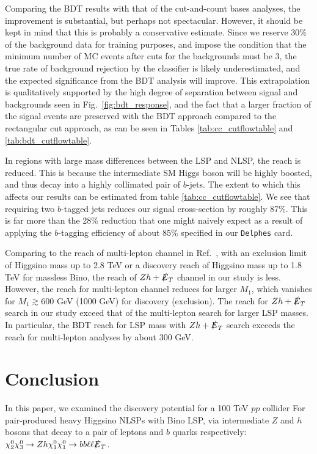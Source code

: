 \documentclass[a4paper,11pt]{article}
\newcommand{\met}{{\slashed{E}_T}}
\begin{document}
Comparing the BDT results with that of the cut-and-count bases analyses, the improvement is substantial, but perhaps not spectacular. However, it should
be kept in mind that this is probably a conservative estimate. Since we reserve
30\% of the background data for training purposes, and impose the condition that the
minimum number of MC events after cuts for the backgrounds must be 3, the true rate of background
rejection by the classifier is likely underestimated, and the expected
significance from the BDT analysis will improve. This extrapolation is
qualitatively supported by the high degree of separation between signal and
backgrounds seen in Fig.~\ref{fig:bdt_response}, and the fact that a larger
fraction of the signal events are preserved with the BDT approach compared to
the rectangular cut approach, as can be seen in Tables \ref{tab:cc_cutflowtable}
and \ref{tab:bdt_cutflowtable}.  

In regions with large mass differences between the LSP and NLSP, the reach is
reduced.  This is because the intermediate SM Higgs boson will be highly boosted, and
thus decay into a highly collimated pair of $b$-jets. The extent to which this
affects our results can be estimated from table \ref{tab:cc_cutflowtable}. We
see that requiring two $b$-tagged jets reduces our signal cross-section by
roughly 87\%. This is far more than the 28\% reduction that one might naively
expect as a result of applying the $b$-tagging efficiency of about 85\%
specified in our \texttt{Delphes} card.  
 
Comparing to the reach of multi-lepton channel in Ref.~\cite{Gori:2014oua},
with an  exclusion limit of Higgsino mass up to 2.8 TeV or a discovery reach
of Higgsino mass up to 1.8 TeV for massless Bino, the reach of $Zh+\met$
channel in our study is less.  However, the reach for multi-lepton channel
reduces for larger $M_1$, which vanishes for $M_1\gtrsim 600$ GeV (1000 GeV)
for discovery (exclusion).   The reach for $Zh+\met$ search in our study
exceed that of the multi-lepton search for larger LSP masses.  In particular,
the BDT reach for LSP mass with $Zh+\met$ search exceeds the reach for
multi-lepton analyses by about 300 GeV.  



\section{Conclusion}\label{sec:conclusion}

In this paper, we examined the discovery potential for a 100 TeV $pp$ collider
For pair-produced heavy Higgsino NLSPs with Bino LSP, via intermediate $Z$ and
$h$ bosons that decay to a pair of leptons and $b$ quarks respectively:
$\chi_2^0\chi_3^0\rightarrow Zh \chi_1^0\chi_1^0\rightarrow bb\ell\ell \met$.
\end{document}
